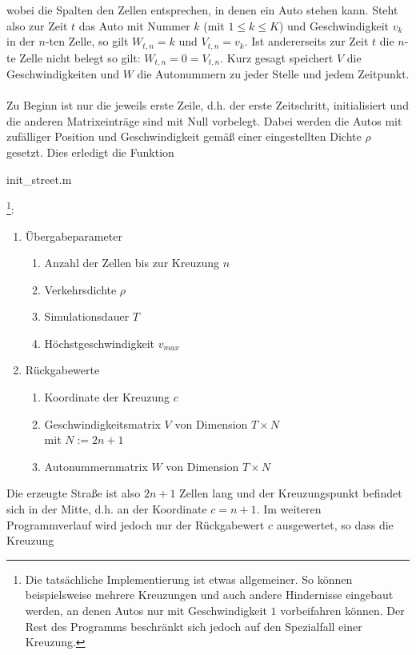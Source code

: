 wobei die Spalten den Zellen entsprechen, in denen ein Auto stehen kann. 
Steht also zur Zeit \(t\) das Auto mit Nummer \(k\) (mit \(1 \leq k \leq K\)) und Geschwindigkeit \(v_k\) in der \(n\)-ten Zelle, 
so gilt \( W_{t, n} = k\) und \(V_{t, n} = v_k\). 
Ist andererseits zur Zeit \(t\) die \(n\)-te Zelle nicht belegt so gilt: \(W_{t, n} = 0 = V_{t, n}\).
Kurz gesagt speichert \(V\) die Geschwindigkeiten und \(W\) die Autonummern zu jeder Stelle und jedem Zeitpunkt.
\\ \\
Zu Beginn ist nur die jeweils erste Zeile, d.h. der erste Zeitschritt, initialisiert und die anderen Matrixeinträge
sind mit Null vorbelegt. Dabei werden die Autos mit zufälliger Position und Geschwindigkeit gemäß
einer eingestellten Dichte \(\rho\) gesetzt. Dies erledigt die Funktion \begin{code}init\_street.m \end{code} \footnote{Die tatsächliche 
Implementierung ist etwas allgemeiner. So können beispielsweise mehrere Kreuzungen und auch andere
Hindernisse eingebaut werden, an denen Autos nur mit Geschwindigkeit \(1\) vorbeifahren können. Der Rest des Programms 
beschränkt sich jedoch auf den Spezialfall einer Kreuzung.}:
\begin{enumerate}
  \item Übergabeparameter
    \begin{enumerate}
      \item Anzahl der Zellen bis zur Kreuzung \(n\) 
      \item Verkehrsdichte \(\rho\)
      \item Simulationsdauer \(T\)
      \item Höchstgeschwindigkeit \(v_{max}\) 
    \end{enumerate}
  \item Rückgabewerte
    \begin{enumerate}
      \item Koordinate der Kreuzung \(c\) 
      \item Geschwindigkeitsmatrix \(V\) von Dimension \(T \times N\) \\ mit \(N := 2n+1\)
      \item Autonummernmatrix \(W\) von Dimension \(T \times N\) 
    \end{enumerate}
\end{enumerate}
Die erzeugte Straße ist also \(2n+1\) Zellen lang und der Kreuzungspunkt befindet sich  in der Mitte, d.h. an der 
Koordinate \(c = n+1\). Im weiteren Programmverlauf wird jedoch nur der Rückgabewert \(c\) ausgewertet, so dass die Kreuzung
